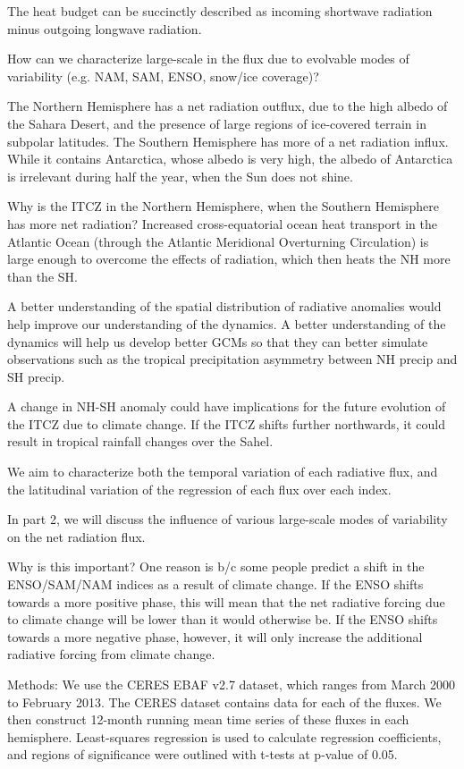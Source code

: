 \documentclass[11pt,a4paper]{article}
\begin{document}
The heat budget can be succinctly described as incoming shortwave radiation minus outgoing longwave radiation. 

How can we characterize large-scale in the flux due to evolvable modes of variability (e.g. NAM, SAM, ENSO, snow/ice coverage)? 

The Northern Hemisphere has a net radiation outflux, due to the high albedo of the Sahara Desert, and the presence of large regions of ice-covered terrain in subpolar latitudes. The Southern Hemisphere has more of a net radiation influx. While it contains Antarctica, whose albedo is very high, the albedo of Antarctica is irrelevant during half the year, when the Sun does not shine. 

Why is the ITCZ in the Northern Hemisphere, when the Southern Hemisphere has more net radiation? Increased cross-equatorial ocean heat transport in the Atlantic Ocean (through the Atlantic Meridional Overturning Circulation) is large enough to overcome the effects of radiation, which then heats the NH more than the SH. 

A better understanding of the spatial distribution of radiative anomalies would help improve our understanding of the dynamics. A better understanding of the dynamics will help us develop better GCMs so that they can better simulate observations such as the tropical precipitation asymmetry between NH precip and SH precip. 

A change in NH-SH anomaly could have implications for the future evolution of the ITCZ due to climate change. If the ITCZ shifts further northwards, it could result in tropical rainfall changes over the Sahel.  

We aim to characterize both the temporal variation of each radiative flux, and the latitudinal variation of the regression of each flux over each index.

In part 2, we will discuss the influence of various large-scale modes of variability on the net radiation flux. 

Why is this important? One reason is b/c some people predict a shift in the ENSO/SAM/NAM indices  as a result of climate change. If the ENSO shifts towards a more positive phase, this will mean that the net radiative forcing due to climate change will be lower than it would otherwise be. If the ENSO shifts towards a more negative phase, however, it will only increase the additional radiative forcing from climate change.

Methods: We use the CERES EBAF v2.7 dataset, which ranges from March 2000 to February 2013. The CERES dataset contains data for each of the fluxes. We then construct 12-month running mean time series of these fluxes in each hemisphere.  Least-squares regression is used to calculate regression coefficients, and regions of significance were outlined with t-tests at p-value of 0.05. 
\end{document}
